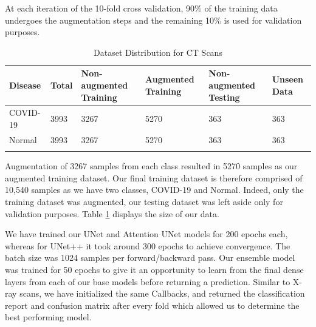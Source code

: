 At each iteration of the 10-fold cross validation, 90\% of the training data undergoes the augmentation steps and the remaining 10\% is used for validation purposes.

\begin{longtable}{| p{} | p{} | p{} | p{} | p{} | p{} |} 

    \hline
\textbf{Disease} & \textbf{Total}    & \textbf{Non-augmented Training}   &\textbf{Augmented Training} &\textbf{Non-augmented Testing} & \textbf{Unseen Data} \\
\hline
			COVID-19    &3993   &3267    &5270   &363   &363
\\\hline
			Normal      &3993   &3267    &5270   &363   &363
\\\hline 

\caption{Dataset Distribution for CT Scans}

  \label{tab:CT Dataset Info}
    \end{longtable}
\vspace{-1em}

Augmentation of 3267 samples from each class resulted in 5270 samples as our augmented training dataset. Our final training dataset is therefore comprised of 10,540 samples as we have two classes, COVID-19 and Normal. Indeed, only the training dataset was augmented, our testing dataset was left aside only for validation purposes. Table \ref{tab:CT Dataset Info} displays the size of our data.

We have trained our UNet and Attention UNet models for 200 epochs each, whereas for UNet++ it took around 300 epochs to achieve convergence. The batch size was 1024 samples per forward/backward pass. Our ensemble model was trained for 50 epochs to give it an opportunity to learn from the final dense layers from each of our base models before returning a prediction. Similar to X-ray scans, we have initialized the same Callbacks, and returned the classification report \cite{SCR} and confusion matrix \cite{SCM} after every fold which allowed us to determine the best performing model.




